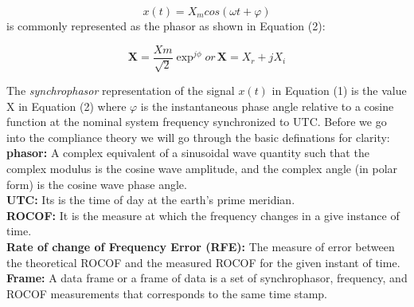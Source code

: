 \begin{equation}
x(t) = X_m cos(\omega t + \varphi)
\end{equation}
is commonly represented as the phasor as shown in Equation (2):

\begin{equation}
\textbf{X} = \frac{Xm}{\sqrt{2}}\exp^{j\phi}
or\hspace{2pt} \textbf{X} = X_r+jX_i
\end{equation}

The \textit{synchrophasor} representation of the signal $x(t)$ in Equation (1) is the value X in Equation (2) where $\varphi$ is the instantaneous phase angle relative to a cosine function at the nominal system frequency synchronized to UTC. Before we go into the compliance theory we will go through the basic definations for clarity:\\
\textbf{phasor:} A complex equivalent of a sinusoidal wave quantity such that the complex modulus is the cosine wave amplitude, and the complex angle (in polar form) is the cosine wave phase angle.\\
\textbf{UTC:} Its is the time of day at the earth's prime meridian.\\
\textbf{ROCOF:} It is the measure at which the frequency changes in a give instance of time.\\
\textbf{Rate of change of Frequency Error (RFE):} The measure of error between the theoretical ROCOF and the measured ROCOF for the given instant of time.\\
\textbf{Frame:} A data frame or a frame of data is a set of synchrophasor, frequency, and ROCOF measurements that corresponds to the same time stamp.\\